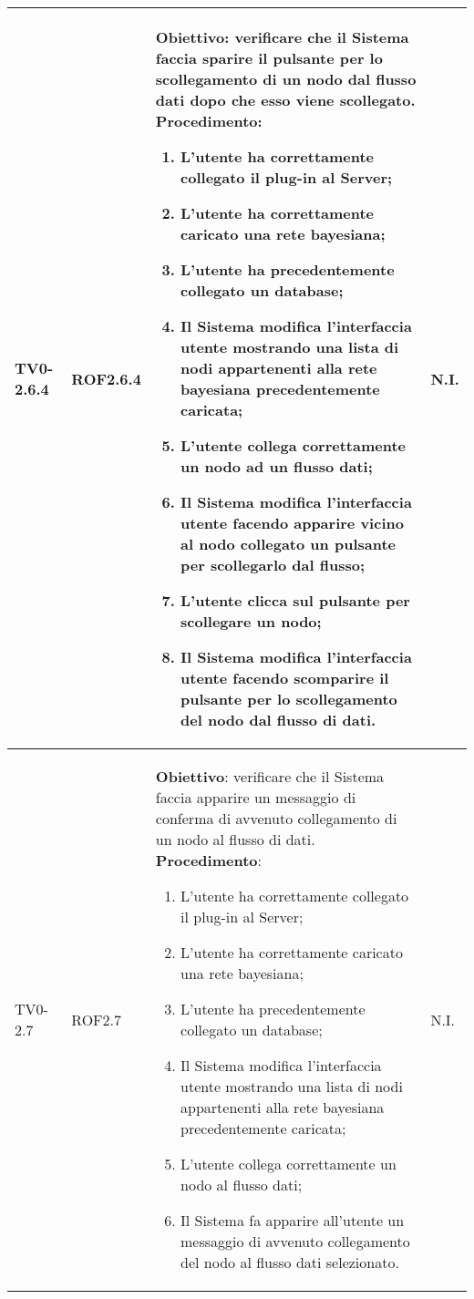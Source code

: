 \begin{longtable}{|C{.15\textwidth}|C{.13\textwidth}|m{.65\textwidth}|C{.08\textwidth}|}
TV0-2.6.4 & ROF2.6.4 &
	\textbf{Obiettivo}: verificare che il Sistema faccia sparire il pulsante per lo scollegamento di un nodo dal flusso dati dopo che esso viene scollegato. \newline
	\textbf{Procedimento}:
	\begin{enumerate}
		\item L'utente ha correttamente collegato il plug-in al Server;
		\item L'utente ha correttamente caricato una rete bayesiana;
		\item L'utente ha precedentemente collegato un database;
		\item Il Sistema modifica l'interfaccia utente mostrando una lista di nodi appartenenti alla rete bayesiana precedentemente caricata;
		\item L'utente collega correttamente un nodo ad un flusso dati;
		\item Il Sistema modifica l'interfaccia utente facendo apparire vicino al nodo collegato un pulsante per scollegarlo dal flusso;
		\item L'utente clicca sul pulsante per scollegare un nodo;
		\item Il Sistema modifica l'interfaccia utente facendo scomparire il pulsante per lo scollegamento del nodo dal flusso di dati. 
	\end{enumerate}
	& N.I. \\
\hline

TV0-2.7 & ROF2.7 &
	\textbf{Obiettivo}: verificare che il Sistema faccia apparire un messaggio di conferma di avvenuto collegamento di un nodo al flusso di dati. \newline
	\textbf{Procedimento}:
	\begin{enumerate}
		\item L'utente ha correttamente collegato il plug-in al Server;
		\item L'utente ha correttamente caricato una rete bayesiana;
		\item L'utente ha precedentemente collegato un database;
		\item Il Sistema modifica l'interfaccia utente mostrando una lista di nodi appartenenti alla rete bayesiana precedentemente caricata;
		\item L'utente collega correttamente un nodo al flusso dati;
		\item Il Sistema fa apparire all'utente un messaggio di avvenuto collegamento del nodo al flusso dati selezionato.
	\end{enumerate}
	& N.I. \\
\hline


\end{longtable}
